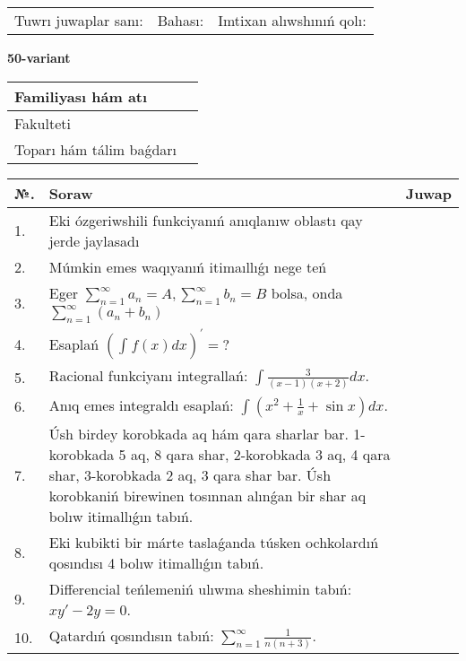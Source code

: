 \documentclass{article}
\begin{document}
\vspace{1cm}

\begin{tabular}{ c c c }
Tuwrı juwaplar sanı: \underline{\hspace{2cm}} & Bahası: \underline{\hspace{2cm}} & Imtixan alıwshınıń qolı: \underline{\hspace{2cm}} \\
\end{tabular}

\newpage

\begin{center}\textbf{50-variant}\end{center}

\bgroup
\def\arraystretch{1.5}
\begin{tabular}{ |m{6cm}|m{10cm}| }
  \hline
  Familiyası hám atı & \\
  \hline
  Fakulteti &\\
  \hline
  Toparı hám tálim baǵdarı & \\
  \hline
\end{tabular}
\egroup

\vspace{0.5cm}

\bgroup
\def\arraystretch{2}
\begin{tabular}{ |l|m{8cm}|m{7cm}| }
  \hline
  №. & Soraw & Juwap \\
  \hline
  1. & Eki ózgeriwshili funkciyanıń anıqlanıw oblastı qay jerde jaylasadı &  \\
  \hline
  2. & Múmkin emes waqıyanıń itimaıllıǵı nege teń &  \\
  \hline
  3. & Eger $\displaystyle\sum_{n = 1}^{\infty}a_{n} = A, \sum_{n = 1}^{\infty}b_{n} = B$ bolsa, onda $\displaystyle\sum_{n = 1}^{\infty}\left( a_{n} + b_{n} \right)$ &  \\
  \hline
  4. & Esaplań $\displaystyle \left( \int_{}^{}{f(x)dx} \right)^\prime = ?$ &  \\
  \hline
  5. & Racional funkciyanı integrallań: $\displaystyle\int {\frac{3}{(x - 1)(x + 2)}dx}$. &  \\
  \hline
  6. & Anıq emes integraldı esaplań: $\displaystyle\int(x^{2}+\frac{1}{x} + \sin x)dx$. &  \\
  \hline
  7. & Úsh birdey korobkada aq hám qara sharlar bar. 1-korobkada 5 aq, 8 qara shar, 2-korobkada 3 aq, 4 qara shar, 3-korobkada 2 aq, 3 qara shar bar. Úsh korobkaniń birewinen tosınnan alınǵan bir shar aq bolıw itimallıǵın tabıń. &  \\
  \hline
  8. & Eki kubikti bir márte taslaǵanda túsken ochkolardıń qosındısı 4 bolıw itimallıǵın tabıń. &  \\
  \hline
  9. & Differencial teńlemeniń ulıwma sheshimin tabıń: $xy' - 2y = 0$. &  \\
  \hline
  10. & Qatardıń qosındısın tabıń: $\displaystyle\sum_{n = 1}^{\infty}\frac{1}{n(n + 3)}$. &  \\
  \hline
\end{tabular}
\egroup
\end{document}
